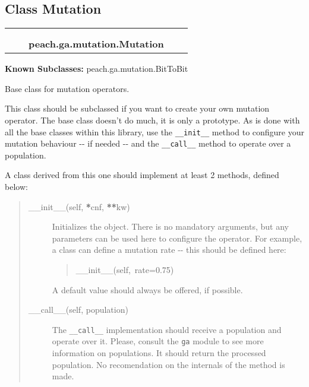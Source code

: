 \subsection{Class Mutation}

    \label{peach:ga:mutation:Mutation}
\begin{tabular}{cccccc}
\multicolumn{2}{r}{\settowidth{\BCL}{object}\multirow{2}{\BCL}{object}}
&&
  \\\cline{3-3}
  &&\multicolumn{1}{c|}{}
&&
  \\
&&\multicolumn{2}{l}{\textbf{peach.ga.mutation.Mutation}}
\end{tabular}

\textbf{Known Subclasses:} peach.ga.mutation.BitToBit


Base class for mutation operators.

This class should be subclassed if you want to create your own mutation
operator. The base class doesn't do much, it is only a prototype. As is done
with all the base classes within this library, use the \texttt{{\_}{\_}init{\_}{\_}} method
to configure your mutation behaviour -{}- if needed -{}- and the \texttt{{\_}{\_}call{\_}{\_}}
method to operate over a population.

A class derived from this one should implement at least 2 methods, defined
below:
\begin{quote}
\begin{description}
\item[{{\_}{\_}init{\_}{\_}(self, {\color{red}\bfseries{}*}cnf, {\color{red}\bfseries{}**}kw)}] %

Initializes the object. There is no mandatory arguments, but any
parameters can be used here to configure the operator. For example, a
class can define a mutation rate -{}- this should be defined here:
\begin{quote}{\ttfamily \raggedright \noindent
{\_}{\_}init{\_}{\_}(self,~rate=0.75)
}\end{quote}

A default value should always be offered, if possible.

\item[{{\_}{\_}call{\_}{\_}(self, population)}] %

The \texttt{{\_}{\_}call{\_}{\_}} implementation should receive a population and operate
over it. Please, consult the \texttt{ga} module to see more information on
populations. It should return the processed population. No recomendation
on the internals of the method is made.

\end{description}
\end{quote}

